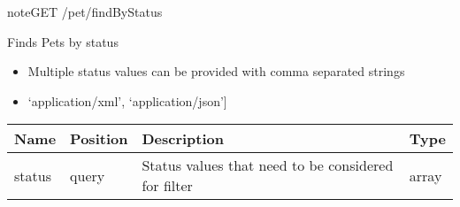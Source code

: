 \documentclass[letterpaper,10pt,english]{sphinxmanual}
\begin{document}
\begin{sphinxadmonition}{note}{GET /pet/findByStatus}

Finds Pets by status\begin{itemize}
\item {} 
Multiple status values can be provided with comma separated strings

\item {} 
\sphinxstylestrong{Produces: 
}{[}‘application/xml’, ‘application/json’{]}

\end{itemize}




\begin{savenotes}\sphinxattablestart
\centering
\begin{tabulary}{\linewidth}[t]{|T|T|T|T|}
\hline
\sphinxstyletheadfamily 
Name
&\sphinxstyletheadfamily 
Position
&\sphinxstyletheadfamily 
Description
&\sphinxstyletheadfamily 
Type
\\
\hline
status
&
query
&
Status values that need to be considered for filter
&
array
\\
\hline
\end{tabulary}
\par
\sphinxattableend\end{savenotes}



\end{sphinxadmonition}
\end{document}
